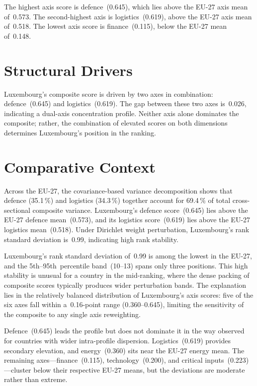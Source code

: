 \documentclass[12pt,a4paper]{article}
\begin{document}
The highest axis score is defence~(0.645), which lies above the EU-27 axis mean of~0.573.  The second-highest axis is logistics~(0.619), above the EU-27 axis mean of~0.518.  The lowest axis score is finance~(0.115), below the EU-27 mean of~0.148.


\section{Structural Drivers}
\label{sec:drivers}

\begin{sloppypar}
Luxembourg's composite score is driven by two axes in combination: defence~(0.645) and logistics~(0.619).  The gap between these two axes is~0.026, indicating a dual-axis concentration profile.  Neither axis alone dominates the composite; rather, the combination of elevated scores on both dimensions determines Luxembourg's position in the ranking.
\end{sloppypar}


\section{Comparative Context}
\label{sec:comparative}

Across the EU-27, the covariance-based variance decomposition shows that defence (35.1\,\%) and logistics (34.3\,\%) together account for 69.4\,\% of total cross-sectional composite variance.  Luxembourg's defence score~(0.645) lies above the EU-27 defence mean~(0.573), and its logistics score~(0.619) lies above the EU-27 logistics mean~(0.518).  Under Dirichlet weight perturbation, Luxembourg's rank standard deviation is~0.99, indicating high rank stability.



Luxembourg's rank standard deviation of~0.99 is among the lowest in the EU-27, and the 5th--95th~percentile band~(10--13) spans only three positions.  This high stability is unusual for a country in the mid-ranking, where the dense packing of composite scores typically produces wider perturbation bands.  The explanation lies in the relatively balanced distribution of Luxembourg's axis scores: five of the six axes fall within a~0.16-point range (0.360--0.645), limiting the sensitivity of the composite to any single axis reweighting.

Defence~(0.645) leads the profile but does not dominate it in the way observed for countries with wider intra-profile dispersion.  Logistics~(0.619) provides secondary elevation, and energy~(0.360) sits near the EU-27 energy mean.  The remaining axes---finance~(0.115), technology~(0.200), and critical inputs~(0.223)---cluster below their respective EU-27 means, but the deviations are moderate rather than extreme.
\end{document}
